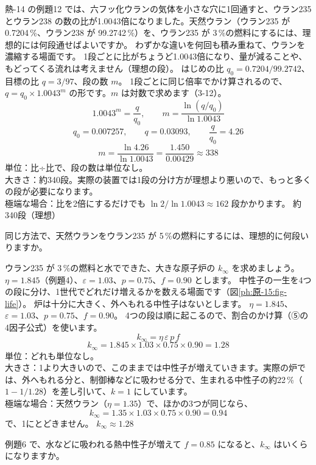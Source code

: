 \label{ph:原-15:ex5}
\begin{phreidai}[濃縮には何段いる？]
熱-14 の例題12 では、六フッ化ウランの気体を小さな穴に1回通すと、ウラン235 とウラン238 の数の比が1.0043倍になりました。天然ウラン（ウラン235 が 0.7204\,\%、ウラン238 が 99.2742\,\%）を、ウラン235 が 3\,\%の燃料にするには、理想的には何段通せばよいですか。
\phbamen
わずかな違いを何回も積み重ねて、ウランを濃縮する場面です。
\phmushi
1段ごとに比がちょうど1.0043倍になり、量が減ることや、もどってくる流れは考えません（理想の段）。
\phzu
はじめの比 $q_0=0.7204/99.2742$、目標の比 $q=3/97$、段の数 $m$。
\phriyu
1段ごとに同じ倍率でかけ算されるので、$q=q_0\times1.0043^m$ の形です。$m$ は対数で求めます（3-12）。
\phtateru
\[ 1.0043^m=\frac{q}{q_0},\qquad m=\frac{\ln(q/q_0)}{\ln1.0043} \]
\phtoku
\[ q_0=0.007257,\qquad q=0.03093,\qquad \frac{q}{q_0}=4.26 \]
\[ m=\frac{\ln4.26}{\ln1.0043}=\frac{1.450}{0.00429}\approx338 \]
\phtashikame
単位：比÷比で、段の数は単位なし。\\
大きさ：約340段。実際の装置では1段の分け方が理想より悪いので、もっと多くの段が必要になります。\\
極端な場合：比を2倍にするだけでも $\ln2/\ln1.0043\approx162$ 段かかります。
\kotae 約340段（理想）
\end{phreidai}
\begin{jibun}
同じ方法で、天然ウランをウラン235 が 5\,\%の燃料にするには、理想的に何段いりますか。
\end{jibun}

\label{ph:原-15:ex6}
\begin{phreidai}
ウラン235 が 3\,\%の燃料と水でできた、大きな原子炉の $k_\infty$ を求めましょう。$\eta=1.845$（例題4）、$\varepsilon=1.03$、$p=0.75$、$f=0.90$ とします。
\phbamen
中性子の一生を4つの段に分け、1世代でどれだけ増えるかを数える場面です（図\ref{ph:原-15:fig-life}）。
\phmushi
炉は十分に大きく、外へもれる中性子はないとします。
\phzu
$\eta=1.845$、$\varepsilon=1.03$、$p=0.75$、$f=0.90$。
\phriyu
4つの段は順に起こるので、割合のかけ算（⑤の4因子公式）を使います。
\phtateru
\[ k_\infty=\eta\,\varepsilon\,p\,f \]
\phtoku
\[ k_\infty=1.845\times1.03\times0.75\times0.90=1.28 \]
\phtashikame
単位：どれも単位なし。\\
大きさ：1より大きいので、このままでは中性子が増えていきます。実際の炉では、外へもれる分と、制御棒などに吸わせる分で、生まれる中性子の約22\,\%（$1-1/1.28$）を差し引いて、$k=1$ にしています。\\
極端な場合：天然ウラン（$\eta=1.35$）で、ほかの3つが同じなら、
\[ k_\infty=1.35\times1.03\times0.75\times0.90=0.94 \]
で、1にとどきません。
\kotae $k_\infty\approx1.28$
\end{phreidai}
\begin{jibun}
例題6 で、水などに吸われる熱中性子が増えて $f=0.85$ になると、$k_\infty$ はいくらになりますか。
\end{jibun}

